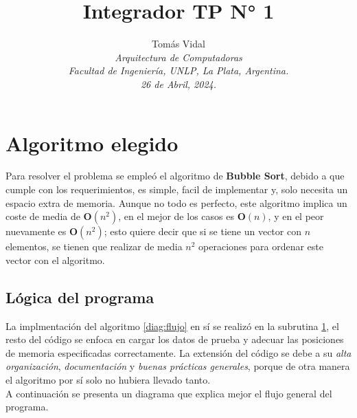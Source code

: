 \documentclass[letterpaper, 10 pt, conference]{ieeeconf}  %
\title{\LARGE \bf Integrador TP N° 1}
\author{
  Tom\'as Vidal\\
  {\it Arquitectura de Computadoras}\\
  {\it Facultad de Ingenier\'ia, UNLP, La Plata, Argentina.}\\
  {\it 26 de Abril, 2024.}
}                                            %
\begin{document}
\maketitle
\thispagestyle{empty}
\pagestyle{empty}


\section{Algoritmo elegido} \label{sec:bubble_sort}
Para resolver el problema se empleó el algoritmo de \textbf{Bubble Sort}, debido a que cumple con los requerimientos, es simple, facil de implementar y, solo necesita un espacio extra de memoria. Aunque no todo es perfecto, este algoritmo implica un coste de media de $\textbf{O}(n^{2})$, en el mejor de los casos es $\textbf{O}(n)$, y en el peor nuevamente es $\textbf{O}(n^{2})$; esto quiere decir que si se tiene un vector con $n$ elementos, se tienen que realizar de media $n^{2}$ operaciones para ordenar este vector con el algoritmo.

\subsection{Lógica del programa}
La implmentación del algoritmo \ref{diag:flujo} en sí se realizó en la subrutina \ref{sec:bubble_sort}, el resto del código se enfoca en cargar los datos de prueba y adecuar las posiciones de memoria especificadas correctamente. La extensión del código se debe a su \textit{alta organización}, \textit{documentación} y \textit{buenas prácticas generales}, porque de otra manera el algoritmo por sí solo no hubiera llevado tanto. \\
\indent A continuación se presenta un diagrama que explica mejor el flujo general del programa.
\begin{figure}[H]
  \tiny
  \centering
  \label{diag:flujo_general}
  \vspace{1cm}
\end{figure}
\end{document}
